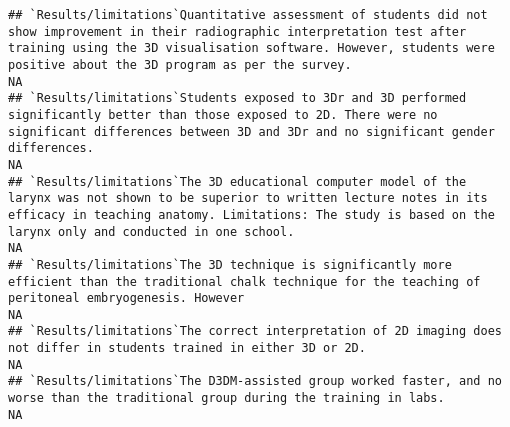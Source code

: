 \documentclass[]{article}
\begin{document}
\begin{verbatim}
## `Results/limitations`Quantitative assessment of students did not show improvement in their radiographic interpretation test after training using the 3D visualisation software. However, students were positive about the 3D program as per the survey.                                                                                                                                                                                                                                 NA
## `Results/limitations`Students exposed to 3Dr and 3D performed significantly better than those exposed to 2D. There were no significant differences between 3D and 3Dr and no significant gender differences.                                                                                                                                                                                                                                                                            NA
## `Results/limitations`The 3D educational computer model of the larynx was not shown to be superior to written lecture notes in its efficacy in teaching anatomy. Limitations: The study is based on the larynx only and conducted in one school.                                                                                                                                                                                                                                         NA
## `Results/limitations`The 3D technique is significantly more efficient than the traditional chalk technique for the teaching of peritoneal embryogenesis. However                                                                                                                                                                                                                                                                                                                        NA
## `Results/limitations`The correct interpretation of 2D imaging does not differ in students trained in either 3D or 2D.                                                                                                                                                                                                                                                                                                                                                                   NA
## `Results/limitations`The D3DM-assisted group worked faster, and no worse than the traditional group during the training in labs.                                                                                                                                                                                                                                                                                                                                                        NA

\end{verbatim}
\end{document}
